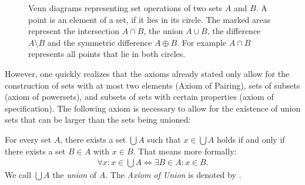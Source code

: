 \begin{figure}[ht]
    \caption{Venn diagrams representing set operations of two sets $A$ and $B$. A point is an element of a set, if it lies in its circle. The marked areas represent the intersection $A\cap B$, the union $A\cup B$, the difference $A\setminus B$ and the symmetric difference $A\oplus B$. For example $A\cap B$ represents all points that lie in both circles.}\label{figure:sets:venn_diagram}
\end{figure}

However, one quickly realizes that the axioms already stated only allow for the construction of sets with at most two elements (Axiom of Pairing), sets of subsets (axiom of powersets), and subsets of sets with certain properties (axiom of specification). The following axiom is necessary to allow for the existence of union sets that can be larger than the sets being unioned:

\begin{axiom}[Union]
    For every set $A$, there exists a set $\bigcup A$ such that $x\in\bigcup A$ holds if and only if there exists a set $B\in A$ with $x\in B$. That means more formally:
    \begin{align}\forall x\colon x\in\bigcup A\Leftrightarrow\exists B\in A\colon x\in B.\end{align}
    We call $\bigcup A$ the \emph{union} of $A$. The \emph{Axiom of Union} is denoted by .
\end{axiom}


